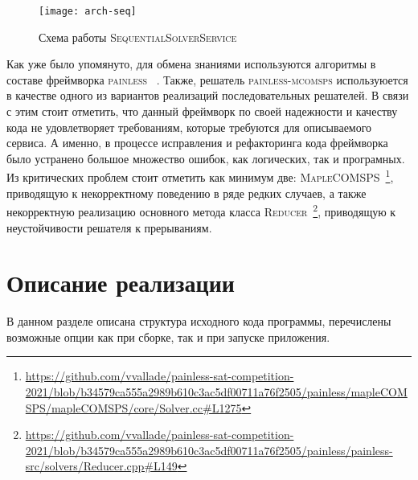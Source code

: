 \begin{figure}[H]
    \caption{Схема работы \textsc{SequentialSolverService}}
    \centering
    \texttt{[image: arch-seq]}
    \label{arch:solver:seq-img}
\end{figure}

Как уже было упомянуто, для обмена знаниями используются алгоритмы в составе фреймворка \textsc{painless}~
\cite{bib:painless}. Также, решатель \textsc{painless-mcomsps} используюется в качестве одного из 
вариантов реализаций последовательных решателей. В связи с этим стоит отметить, что данный фреймворк 
по своей надежности и качеству кода не удовлетворяет требованиям, которые требуются для описываемого 
сервиса. А именно, в процессе исправления и рефакторинга кода фреймворка было устранено большое множество 
ошибок, как логических, так и програмных. Из критических проблем стоит отметить как минимум две:
\textsc{MapleCOMSPS}~\footnote{\url{https://github.com/vvallade/painless-sat-competition-2021/blob/b34579ca555a2989b610c3ac5df00711a76f2505/painless/mapleCOMSPS/mapleCOMSPS/core/Solver.cc#L1275}},
приводящую к некорректному поведению в ряде редких случаев, а также некорректную реализацию основного
метода класса \textsc{Reducer}~\footnote{\url{https://github.com/vvallade/painless-sat-competition-2021/blob/b34579ca555a2989b610c3ac5df00711a76f2505/painless/painless-src/solvers/Reducer.cpp#L149}},
приводящую к неустойчивости решателя к прерываниям.

\section{Описание реализации}\label{arch:impl}

В данном разделе описана структура исходного кода программы, перечислены возможные опции как при
сборке, так и при запуске приложения.

\chapterconclusion

